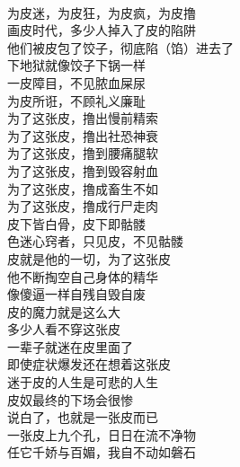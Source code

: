 \begin{poem}[皮奴]
    \begin{multicols}{2}
        \begin{center}~\\
            为皮迷，为皮狂，为皮疯，为皮撸 \\ 画皮时代，多少人掉入了皮的陷阱 \\ 他们被皮包了饺子，彻底陷（馅）进去了 \\ 下地狱就像饺子下锅一样 \\ 一皮障目，不见脓血屎尿 \\ 为皮所诳，不顾礼义廉耻 \\ 为了这张皮，撸出慢前精索 \\ 为了这张皮，撸出社恐神衰 \\ 为了这张皮，撸到腰痛腿软 \\ 为了这张皮，撸到毁容射血 \\ 为了这张皮，撸成畜生不如 \\ 为了这张皮，撸成行尸走肉 \\ 皮下皆白骨，皮下即骷髅 \\ 色迷心窍者，只见皮，不见骷髅 \\ 皮就是他的一切，为了这张皮 \\ 他不断掏空自己身体的精华 \\ 像傻逼一样自残自毁自废 \\ 皮的魔力就是这么大 \\ 多少人看不穿这张皮 \\ 一辈子就迷在皮里面了 \\ 即使症状爆发还在想着这张皮 \\ 迷于皮的人生是可悲的人生 \\ 皮奴最终的下场会很惨 \\ 说白了，也就是一张皮而已 \\ 一张皮上九个孔，日日在流不净物 \\ 任它千娇与百媚，我自不动如磐石
        \end{center}
    \end{multicols}
\end{poem}

